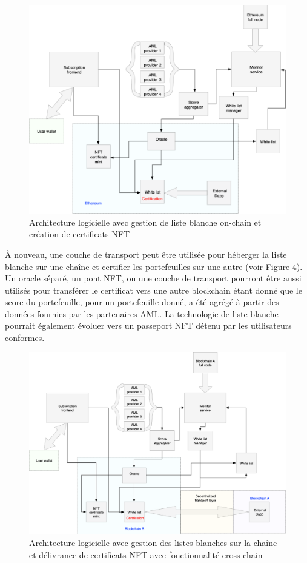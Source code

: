 ﻿\documentclass[a4paper]{article}
\begin{document}
\begin{figure}[!h]
\centering
\includegraphics[scale=0.35]{architecture_v2_trim.png}
\caption{Architecture logicielle avec gestion de liste blanche on-chain et création de certificats NFT}
\label{onchain}
\end{figure}

À nouveau, une couche de transport peut être utilisée pour héberger la liste blanche sur une chaîne et certifier les portefeuilles sur une autre (voir Figure 4).
Un oracle séparé, un pont NFT, ou une couche de transport pourront être aussi utilisés pour transférer le certificat vers une autre blockchain étant donné que le score du portefeuille, pour un portefeuille donné, a été agrégé à partir des données fournies par les partenaires AML. La technologie de liste blanche pourrait également évoluer vers un passeport NFT détenu par les utilisateurs conformes. \\
  
\begin{figure}[!h]
\centering
\includegraphics[scale=0.35]{architecture_v2_crosschain_trim.png}
\caption{Architecture logicielle avec gestion des listes blanches sur la chaîne et délivrance de certificats NFT avec fonctionnalité cross-chain}
\label{onchain}
\end{figure}
\end{document}
